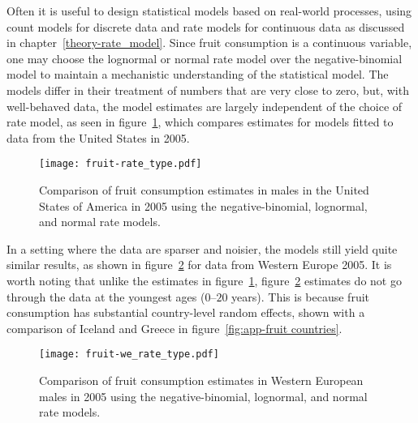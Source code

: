 Often it is useful to design statistical models based on real-world
processes, using count models for discrete data and rate models for
continuous data as discussed in chapter~\ref{theory-rate_model}.
Since fruit consumption is a continuous variable, one may choose the
lognormal or normal rate model over the negative-binomial model to
maintain a mechanistic understanding of the statistical model.  The
models differ in their treatment of numbers that are very close to
zero, but, with well-behaved data, the model estimates are largely
independent of the choice of rate model, as seen in
figure~\ref{fig:app-fruit rate type}, which compares estimates for
models fitted to data from the United States in 2005.

    \begin{figure}[h]
        \begin{center}
            \texttt{[image: fruit-rate\_type.pdf]}
            \caption[Systematic review data for fruit consumption.]{Comparison
              of fruit consumption estimates in
              males in the United States of America in 2005 using the
              negative-binomial, lognormal, and normal rate models.}
            \label{fig:app-fruit rate type}
        \end{center}
    \end{figure}

In a setting where the data are sparser and noisier, the
models still yield quite similar results, as shown in figure~\ref{fig:app-fruit europe}
for data from Western Europe 2005.  It is worth noting that unlike
the estimates in figure~\ref{fig:app-fruit rate type},
figure~\ref{fig:app-fruit europe} estimates do not go through the
data at the youngest ages ($0$--$20$ years).  This is because fruit consumption has
substantial country-level random effects, shown with a comparison of
Iceland and Greece in figure~\ref{fig:app-fruit countries}.

    \begin{figure}[h]
        \begin{center}
            \texttt{[image: fruit-we\_rate\_type.pdf]}
            \caption[Comparison of regional fruit consumption estimates using different
              rate models.]{Comparison of fruit consumption estimates in
              Western European males in 2005 using the
              negative-binomial, lognormal, and normal rate models.}
            \label{fig:app-fruit europe}
        \end{center}
    \end{figure}


